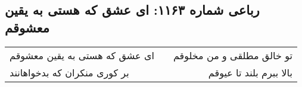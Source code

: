 \begin{center}
\section*{رباعی شماره ۱۱۶۳: ای عشق که هستی به یقین معشوقم}
\label{sec:1163}
\begin{longtable}{l p{0.5cm} r}
ای عشق که هستی به یقین معشوقم
&&
تو خالق مطلقی و من مخلوقم
\\
بر کوری منکران که بدخواهانند
&&
بالا ببرم بلند تا عیوقم
\\
\end{longtable}
\end{center}
